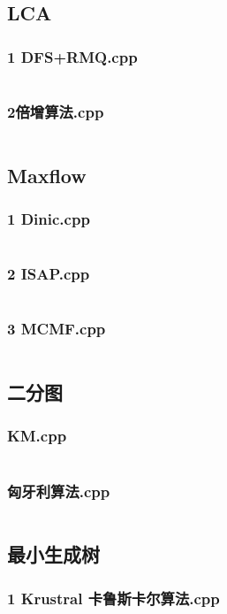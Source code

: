 \documentclass{article}
\begin{document}
\subsection{LCA}
\subsubsection{1 DFS+RMQ.cpp}
\inputminted{c++}{/home/zzuzxy/t2/ACM-template/3 图论/LCA/1 DFS+RMQ.cpp}
\subsubsection{2倍增算法.cpp}
\inputminted{c++}{/home/zzuzxy/t2/ACM-template/3 图论/LCA/2倍增算法.cpp}
\subsection{Maxflow}
\subsubsection{1 Dinic.cpp}
\inputminted{c++}{/home/zzuzxy/t2/ACM-template/3 图论/Maxflow/1 Dinic.cpp}
\subsubsection{2 ISAP.cpp}
\inputminted{c++}{/home/zzuzxy/t2/ACM-template/3 图论/Maxflow/2 ISAP.cpp}
\subsubsection{3 MCMF.cpp}
\inputminted{c++}{/home/zzuzxy/t2/ACM-template/3 图论/Maxflow/3 MCMF.cpp}
\subsection{二分图}
\subsubsection{KM.cpp}
\inputminted{c++}{/home/zzuzxy/t2/ACM-template/3 图论/二分图/KM.cpp}
\subsubsection{匈牙利算法.cpp}
\inputminted{c++}{/home/zzuzxy/t2/ACM-template/3 图论/二分图/匈牙利算法.cpp}
\subsection{最小生成树}
\subsubsection{1 Krustral 卡鲁斯卡尔算法.cpp}
\inputminted{c++}{/home/zzuzxy/t2/ACM-template/3 图论/最小生成树/1 Krustral 卡鲁斯卡尔算法.cpp}
\end{document}
